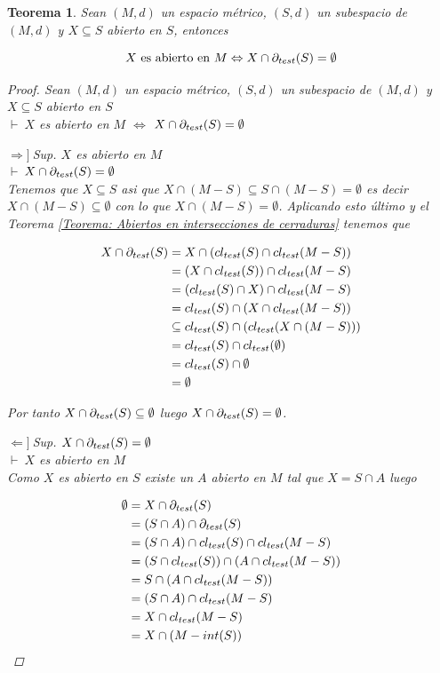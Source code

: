 \documentclass[oneside]{book} %
\theoremstyle{Teorema}
\newtheorem{Teorema}[Definicion]{Teorema}
\theoremstyle{Ejemplos}
\theoremstyle{[Obs]}
\def \test {test}
\newcommand{\cerradura}[2][\test]{\ifx \test #1 {\overline{#2}} \else {cl_{#1}(#2)} \fi} %
\newcommand{\frontera}[2][\test]{\ifx \test #1 {\partial(#2)} \else {\partial_{#1}(#2)} \fi} %
\renewcommand{\{}{\left\lbrace} %
\renewcommand{\}}{\right\rbrace} %
\newcommand{\n}{\cap} %
\renewcommand{\sc}{\subseteq} %
\newcommand{\pd}{$\vdash\ $} %
\newcommand{\necesidad}{$\Rightarrow]\ $} %
\newcommand{\suficiencia}{$\Leftarrow]\ $} %
\begin{document}
			\begin{Teorema}\setlength{\parindent}{0em}
			
				Sean $(M, d)$ un espacio métrico, $(S, d)$ un subespacio de $(M, d)$ y $X \sc S$ abierto en $S$, entonces 

				\[ X \text{ es abierto en } M \Leftrightarrow X \n \frontera{S} = \emptyset \]

				\begin{proof}
					
					Sean $(M, d)$ un espacio métrico, $(S, d)$ un subespacio de $(M, d)$ y $X \sc S$ abierto en $S$ \\ 
					\pd $X$ es abierto en $M$ $\Leftrightarrow$ $X \n \frontera{S} = \emptyset$ 

					\necesidad Sup. $X$ es abierto en $M$ \\ 
					\pd $X \n \frontera{S} = \emptyset$ \\ 
					Tenemos que $X \sc S$ asi que $X \n (M - S) \sc S \n (M - S) = \emptyset$ es decir $X \n (M - S) \sc \emptyset$ con lo que $X \n (M - S) = \emptyset$. Aplicando esto último y el Teorema \ref{Teorema: Abiertos en intersecciones de cerraduras} tenemos que
					
					\begin{align*}
						X \n \frontera{S} &= X \n (\cerradura{S} \n \cerradura{M - S}) \\ 
						&= (X \n \cerradura{S}) \n \cerradura{M - S} \\ 
						&= (\cerradura{S} \n X) \n \cerradura{M - S} \\ 
						&= \cerradura{S} \n (X \n \cerradura{M - S}) \\ 
						&\sc \cerradura{S} \n (\cerradura{X \n (M - S)}) \\ 
						&= \cerradura{S} \n \cerradura{\emptyset} \\ 
						&= \cerradura{S} \n \emptyset \\ 
						&= \emptyset
					\end{align*}

					Por tanto $X \n \frontera{S} \sc \emptyset$ luego $X \n \frontera{S} = \emptyset$.

					\suficiencia Sup. $X \n \frontera{S} = \emptyset$ \\ 
					\pd $X$ es abierto en $M$ \\
					Como $X$ es abierto en $S$ existe un $A$ abierto en $M$ tal que $X = S \n A$ luego 
					
					\begin{align*}
						\emptyset &= X \n \frontera{S} \\  
						&= (S \n A) \n \frontera{S} \\ 
						&= (S \n A) \n \cerradura{S} \n \cerradura{M - S} \\ 
						&= (S \n \cerradura{S}) \n (A \n \cerradura{M - S}) \\ 
						&= S \n (A \n \cerradura{M - S}) \\ 
						&= (S \n A) \n \cerradura{M - S} \\  
						&= X \n \cerradura{M - S} \\ 
						&= X \n (M - int(S))
					\end{align*}
					

\end{proof}
\end{Teorema}
\end{document}
